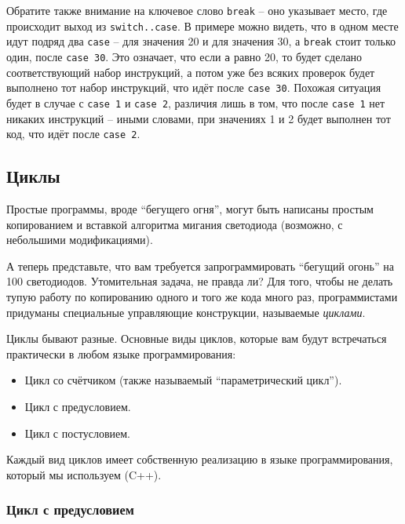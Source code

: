 \documentclass[../sparc.tex]{subfiles}
\begin{document}
Обратите также внимание на ключевое слово \texttt{break} -- оно указывает место,
где происходит выход из \texttt{switch..case}.  В примере можно видеть, что в
одном месте идут подряд два \texttt{case} -- для значения 20 и для значения 30, а
\texttt{break} стоит только один, после \texttt{case 30}.  Это означает, что
если \texttt{a} равно 20, то будет сделано соответствующий набор инструкций, а
потом уже без всяких проверок будет выполнено тот набор инструкций, что идёт
после \texttt{case 30}.  Похожая ситуация будет в случае с \texttt{case 1} и
\texttt{case 2}, различия лишь в том, что после \texttt{case 1} нет никаких
инструкций -- иными словами, при значениях 1 и 2 будет выполнен тот код, что идёт
после \texttt{case 2}.

\subsection{Циклы}

Простые программы, вроде ``бегущего огня'', могут быть написаны простым
копированием и вставкой алгоритма мигания светодиода (возможно, с небольшими
модификациями).

А теперь представьте, что вам требуется запрограммировать ``бегущий огонь'' на
100 светодиодов. Утомительная задача, не правда ли? Для того, чтобы не делать
тупую работу по копированию одного и того же кода много раз, программистами
придуманы специальные управляющие конструкции, называемые \emph{циклами}.

Циклы бывают разные. Основные виды циклов, которые вам будут встречаться
практически в любом языке программирования:
\begin{itemize}
\item Цикл со счётчиком (также называемый ``параметрический цикл'').
\item Цикл с предусловием.
\item Цикл с постусловием.
\end{itemize}

Каждый вид циклов имеет собственную реализацию в языке программирования, который
мы используем (C++).

\subsubsection{Цикл с предусловием}
\end{document}
